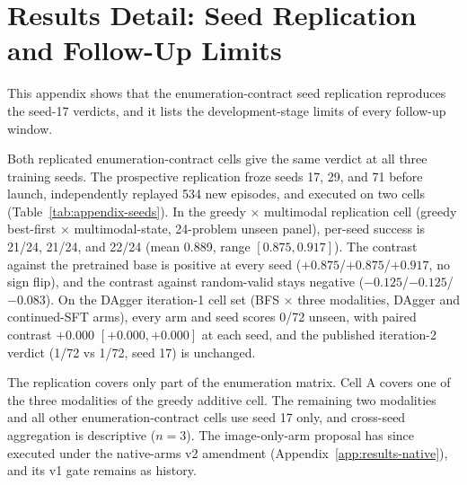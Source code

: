 \section{Results Detail: Seed Replication and Follow-Up Limits}
\label{app:results-boundary}

This appendix shows that the enumeration-contract seed replication reproduces the seed-17 verdicts, and it lists the development-stage limits of every follow-up window.

Both replicated enumeration-contract cells give the same verdict at all three training seeds. The prospective replication froze seeds 17, 29, and 71 before launch, independently replayed 534 new episodes, and executed on two cells (Table~\ref{tab:appendix-seeds}). In the greedy $\times$ multimodal replication cell (greedy best-first $\times$ multimodal-state, 24-problem unseen panel), per-seed success is 21/24, 21/24, and 22/24 (mean 0.889, range $[0.875, 0.917]$). The contrast against the pretrained base is positive at every seed ($+0.875$/$+0.875$/$+0.917$, no sign flip), and the contrast against random-valid stays negative ($-0.125$/$-0.125$/$-0.083$). On the DAgger iteration-1 cell set (BFS $\times$ three modalities, DAgger and continued-SFT arms), every arm and seed scores 0/72 unseen, with paired contrast $+0.000$ $[+0.000, +0.000]$ at each seed, and the published iteration-2 verdict (1/72 vs 1/72, seed 17) is unchanged.

The replication covers only part of the enumeration matrix. Cell A covers one of the three modalities of the greedy additive cell. The remaining two modalities and all other enumeration-contract cells use seed 17 only, and cross-seed aggregation is descriptive ($n{=}3$). The image-only-arm proposal has since executed under the native-arms v2 amendment (Appendix~\ref{app:results-native}), and its v1 gate remains as history.


